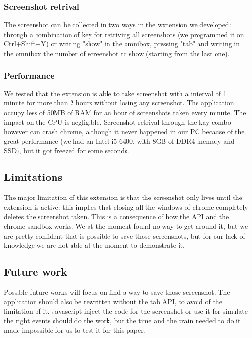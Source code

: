 \documentclass[12pt]{article}
\begin{document}
\begin{multicols}{2}
\subsubsection*{Screenshot retrival}
The screenshot can be collected in two ways in the wxtension we developed:
through a combination of key for retriving all screenshots (we programmed it on Ctrl+Shift+Y) or writing "show" in the omnibox, pressing "tab" and writing in the omnibox the number of screenshot to show (starting from the last one).
\subsubsection*{Performance}
We tested that the extension is able to take screenshot with a interval of 1 minute for more than 2 hours without losing any screenshot.
The application occupy less of 50MB of RAM for an hour of screenshots taken every minute. The impact on the CPU is negligible.
Screenshot retrival through the kay combo however can  crash chrome, although it never happened in our PC because of the great performance (we had an Intel i5 6400, with 8GB of DDR4 memory and SSD), but it got freezed for some seconds.
\subsection*{Limitations}
The major limitation of this extension is that the screenshot only lives until the extension is active: this implies that closing all the windows of chrome completely deletes the screenshot taken.
This is a consequence of how the API and the chrome sandbox works. We at the moment found no way to get around it, but we are pretty confident that is possible to save those screenshots, but for our lack of knowledge we are not able at the moment to demonstrate it.
\subsection*{Future work}
Possible future works will focus on find a way to save those screenshot.
The application should also be rewritten without the tab API, to avoid of the limitation of it.
Javascript inject the code for the screenshot or use it for simulate the right events should do the work, but the time and the train needed to do it made impossible for us to test it for this paper.

\end{multicols}
\end{document}
